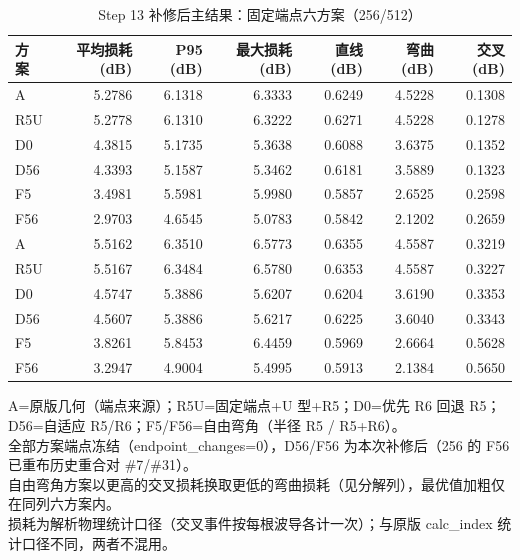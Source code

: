 \begin{table}[htbp]
  \centering
  \caption{Step 13 补修后主结果：固定端点六方案（256/512）}
  \label{tab:step13-main}
  \begin{tabular}{lrrrrrr}
    \toprule
    方案 & 平均损耗 (dB) & P95 (dB) & 最大损耗 (dB) & 直线 (dB) & 弯曲 (dB) & 交叉 (dB) \\
    \midrule
    A & 5.2786 & 6.1318 & 6.3333 & 0.6249 & 4.5228 & 0.1308 \\
    R5U & 5.2778 & 6.1310 & 6.3222 & 0.6271 & 4.5228 & 0.1278 \\
    D0 & 4.3815 & 5.1735 & 5.3638 & 0.6088 & 3.6375 & 0.1352 \\
    D56 & 4.3393 & 5.1587 & 5.3462 & 0.6181 & 3.5889 & 0.1323 \\
    F5 & 3.4981 & 5.5981 & 5.9980 & 0.5857 & 2.6525 & 0.2598 \\
    F56 & 2.9703 & 4.6545 & 5.0783 & 0.5842 & 2.1202 & 0.2659 \\
    \midrule
    A & 5.5162 & 6.3510 & 6.5773 & 0.6355 & 4.5587 & 0.3219 \\
    R5U & 5.5167 & 6.3484 & 6.5780 & 0.6353 & 4.5587 & 0.3227 \\
    D0 & 4.5747 & 5.3886 & 5.6207 & 0.6204 & 3.6190 & 0.3353 \\
    D56 & 4.5607 & 5.3886 & 5.6217 & 0.6225 & 3.6040 & 0.3343 \\
    F5 & 3.8261 & 5.8453 & 6.4459 & 0.5969 & 2.6664 & 0.5628 \\
    F56 & 3.2947 & 4.9004 & 5.4995 & 0.5913 & 2.1384 & 0.5650 \\
    \bottomrule
  \end{tabular}
  \par\vspace{2pt}
  \begin{flushleft}\footnotesize
  A=原版几何（端点来源）；R5U=固定端点+U 型+R5；D0=优先 R6 回退 R5；D56=自适应 R5/R6；F5/F56=自由弯角（半径 R5 / R5+R6）。 \\
  全部方案端点冻结（endpoint\_changes=0），D56/F56 为本次补修后（256 的 F56 已重布历史重合对 \#7/\#31）。 \\
  自由弯角方案以更高的交叉损耗换取更低的弯曲损耗（见分解列），最优值加粗仅在同列六方案内。 \\
  损耗为解析物理统计口径（交叉事件按每根波导各计一次）；与原版 calc\_index 统计口径不同，两者不混用。 \\
  \end{flushleft}
\end{table}
